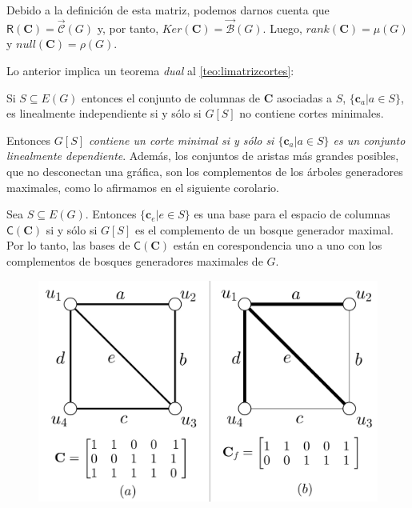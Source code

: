  Debido a la definición de esta matriz, podemos darnos cuenta que $\mathsf{R}(\mathbf{C}) =\overrightarrow{\mathcal{C}}(G)$ y, por tanto, $Ker(\mathbf{C}) = \overrightarrow{\mathcal{B}}(G)$. Luego, $rank(\mathbf{C}) = \mu(G)$ y $null(\mathbf{C}) = \rho(G)$.
 
 Lo anterior implica un teorema \textit{dual} al \ref{teo:limatrizcortes}:
 
\begin{teo}\label{teo:limatrizciclos}
Si $S\subseteq E(G)$ entonces el conjunto de columnas de $\mathbf{C}$ asociadas a $S$, $\{\mathbf{c}_{a}| a \in S\}$, es linealmente independiente si y sólo si $G[S]$ no contiene cortes minimales.
\end{teo}

 
 Entonces \textit{$G[S]$ contiene un corte minimal si y sólo si $\{\mathbf{c}_{a} | a \in S\}$ es un conjunto linealmente dependiente}. Además, los conjuntos de aristas más grandes posibles, que no desconectan una gráfica, son los complementos de los árboles generadores maximales, como lo afirmamos en el siguiente corolario.

\begin{cor} Sea
$S \subseteq E(G)$. Entonces $\{\mathbf{c}_{e} | e \in S\}$ es una base para el espacio de columnas $\mathsf{C}(\mathbf{C})$ si y sólo si $G[S]$ es el complemento de un bosque generador maximal. Por lo tanto, las bases de $\mathsf{C}(\mathbf{C})$ están en corespondencia uno a uno con los complementos de bosques generadores maximales de $G$.
\end{cor} 

\begin{figure}[h]
    \centering
    \includegraphics[scale=0.25]{img/imgchapter4/matrizdeciclos.jpg}
    \caption{}
    \label{fig:matrizdeciclos}
\end{figure}

